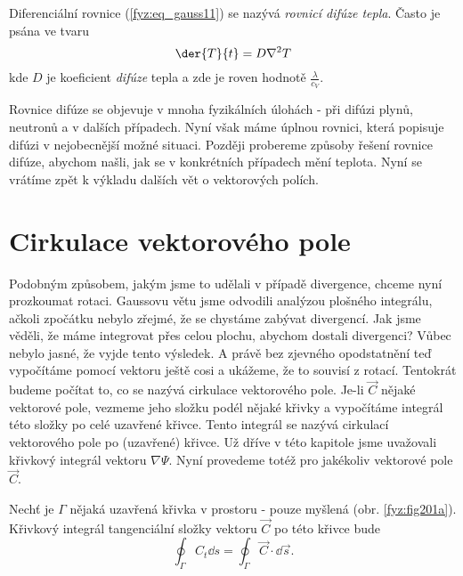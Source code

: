       Diferenciální rovnice (\ref{fyz:eq_gauss11}) se nazývá \emph{rovnicí difúze tepla}. Často je 
      psána ve tvaru
      \begin{equation}\label{fyz:eq_gauss12}
       \der{T}{t} = D\nabla^2T
      \end{equation}
      kde \(D\) je koeficient \emph{difúze} tepla a zde je roven hodnotě
      \(\displaystyle\frac{\lambda}{c_V}\).
      
      Rovnice difúze se objevuje v mnoha fyzikálních úlohách - při difúzi plynů, neutronů a v 
      dalších případech. Nyní však máme úplnou rovnici, která popisuje difúzi v nejobecnější možné 
      situaci. Později probereme způsoby řešení rovnice difúze, abychom našli, jak se v konkrétních 
      případech mění teplota. Nyní se vrátíme zpět k výkladu dalších vět o vektorových polích.

  \section{Cirkulace vektorového pole}\label{fyz:IIchapIIIsecIV}
    Podobným způsobem, jakým jsme to udělali v případě divergence, chceme nyní prozkoumat rotaci. 
    Gaussovu větu jsme odvodili analýzou plošného integrálu, ačkoli zpočátku nebylo zřejmé, že se 
    chystáme zabývat divergencí. Jak jsme věděli, že máme integrovat přes celou plochu, abychom 
    dostali divergenci? Vůbec nebylo jasné, že vyjde tento výsledek. A právě bez zjevného  
    opodstatnění teď vypočítáme pomocí vektoru ještě cosi a ukážeme, že to souvisí z rotací. 
    Tentokrát budeme počítat to, co se nazývá cirkulace vektorového pole. Je-li \(\vec{C}\) nějaké 
    vektorové pole, vezmeme jeho složku podél nějaké křivky a vypočítáme integrál této složky po 
    celé uzavřené křivce. Tento integrál se nazývá cirkulací vektorového pole po (uzavřené) křivce. 
    Už dříve v této kapitole jsme uvažovali křivkový integrál vektoru \(\nabla\Psi\). Nyní 
    provedeme totéž pro jakékoliv vektorové pole \(\vec{C}\).
    
    Nechť je \(\Gamma\) nějaká uzavřená křivka v prostoru - pouze myšlená (obr. \ref{fyz:fig201a}). 
    Křivkový integrál tangenciální složky vektoru \(\vec{C}\) po této křivce bude
    \begin{equation}\label{fyz:eq_fey_circ1}
     \oint_\Gamma C_t\dd{s} = \oint_\Gamma\vec{C}\cdot\dd{\vec{s}}.
    \end{equation}    
    
